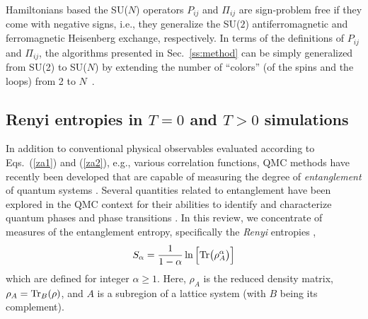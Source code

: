 \documentclass[range]{ar2e}
\begin{document}
Hamiltonians based the SU($N$) operators $P_{ij}$ and $\Pi_{ij}$ are sign-problem free if they come with negative signs, i.e.,
they generalize the SU($2$) antiferromagnetic and ferromagnetic Heisenberg exchange, respectively. In terms of the definitions of $P_{ij}$ and 
$\Pi_{ij}$, the algorithms presented in Sec.~\ref{ss:method} can be simply generalized from SU(2) to SU($N$) by extending the number of ``colors'' 
(of the spins and the loops) from 2 to $N$~\cite{harada2003:sun,beach2009:sun,kaul2011:j1j2}.

\subsection{Renyi entropies in $T=0$ and $T>0$ simulations} 
\label{ss:renyi}

In addition to conventional physical observables evaluated according to Eqs.~(\ref{za1}) and (\ref{za2}), e.g., various correlation functions, 
QMC methods have recently been developed that are capable of measuring the degree of {\it entanglement} of quantum systems \cite{EntangleMeasure}. Several 
quantities related to entanglement have been explored in the QMC context for their abilities to identify and characterize quantum phases and phase 
transitions \cite{Tommaso1,Tommaso2,fluc1,fluc2,fid1,fid2}.  In this review, we concentrate of measures of the entanglement entropy, specifically 
the {\it Renyi} entropies \cite{renyi},
\begin{equation}
S_{\alpha} = \frac{1}{1-\alpha} \ln \Big[ {\rm Tr}\big( \rho_A^{\alpha} \big) \Big]
\end{equation}
which are defined for integer $\alpha \ge 1$.  Here, $\rho_A$ is the reduced density matrix, $\rho_A = {\rm Tr}_B (\rho)$, and $A$ is a subregion of 
a lattice system (with $B$ being its complement).  
 
\end{document}
